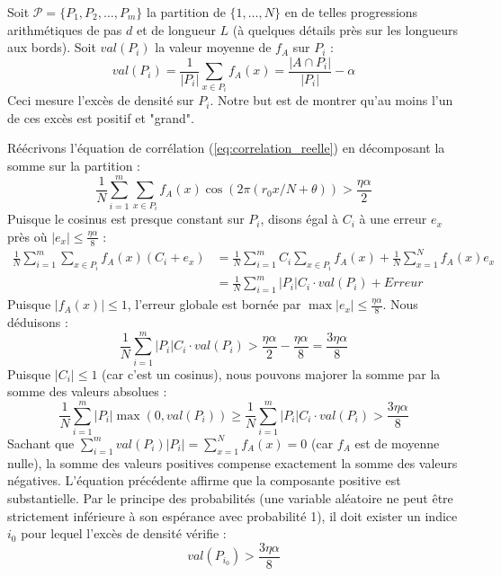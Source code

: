 \documentclass[12pt, a4paper]{article}
\begin{document}
Soit $\mathcal{P} = \{P_1, P_2, \dots, P_m\}$ la partition de $\{1, \dots, N\}$ en de telles progressions arithmétiques de pas $d$ et de longueur $L$ (à quelques détails près sur les longueurs aux bords).
Soit $val(P_i)$ la valeur moyenne de $f_A$ sur $P_i$ :
\begin{equation}
val(P_i) = \frac{1}{|P_i|} \sum_{x \in P_i} f_A(x) = \frac{|A \cap P_i|}{|P_i|} - \alpha
\end{equation}
Ceci mesure l'excès de densité sur $P_i$. Notre but est de montrer qu'au moins l'un de ces excès est positif et "grand".

Réécrivons l'équation de corrélation (\ref{eq:correlation_reelle}) en décomposant la somme sur la partition :
\begin{equation}
\frac{1}{N} \sum_{i=1}^m \sum_{x \in P_i} f_A(x) \cos(2\pi (r_0 x / N + \theta)) > \frac{\eta \alpha}{2}
\end{equation}
Puisque le cosinus est presque constant sur $P_i$, disons égal à $C_i$ à une erreur $e_x$ près où $|e_x| \leq \frac{\eta \alpha}{8}$ :
\begin{align}
\frac{1}{N} \sum_{i=1}^m \sum_{x \in P_i} f_A(x) (C_i + e_x) &= \frac{1}{N} \sum_{i=1}^m C_i \sum_{x \in P_i} f_A(x) + \frac{1}{N} \sum_{x = 1}^{N} f_A(x) e_x \\
&= \frac{1}{N} \sum_{i=1}^m |P_i| C_i \cdot val(P_i) + Erreur
\end{align}
Puisque $|f_A(x)| \leq 1$, l'erreur globale est bornée par $\max |e_x| \leq \frac{\eta \alpha}{8}$.
Nous déduisons :
\begin{equation}
\frac{1}{N} \sum_{i=1}^m |P_i| C_i \cdot val(P_i) > \frac{\eta \alpha}{2} - \frac{\eta \alpha}{8} = \frac{3\eta \alpha}{8}
\end{equation}
Puisque $|C_i| \leq 1$ (car c'est un cosinus), nous pouvons majorer la somme par la somme des valeurs absolues :
\begin{equation}
\frac{1}{N} \sum_{i=1}^m |P_i| \max(0, val(P_i)) \geq \frac{1}{N} \sum_{i=1}^m |P_i| C_i \cdot val(P_i) > \frac{3\eta \alpha}{8}
\end{equation}
Sachant que $\sum_{i=1}^m val(P_i) |P_i| = \sum_{x=1}^N f_A(x) = 0$ (car $f_A$ est de moyenne nulle), la somme des valeurs positives compense exactement la somme des valeurs négatives.
L'équation précédente affirme que la composante positive est substantielle.
Par le principe des probabilités (une variable aléatoire ne peut être strictement inférieure à son espérance avec probabilité 1), il doit exister un indice $i_0$ pour lequel l'excès de densité vérifie :
\begin{equation}
val(P_{i_0}) > \frac{3\eta \alpha}{8}
\end{equation}
\end{document}

